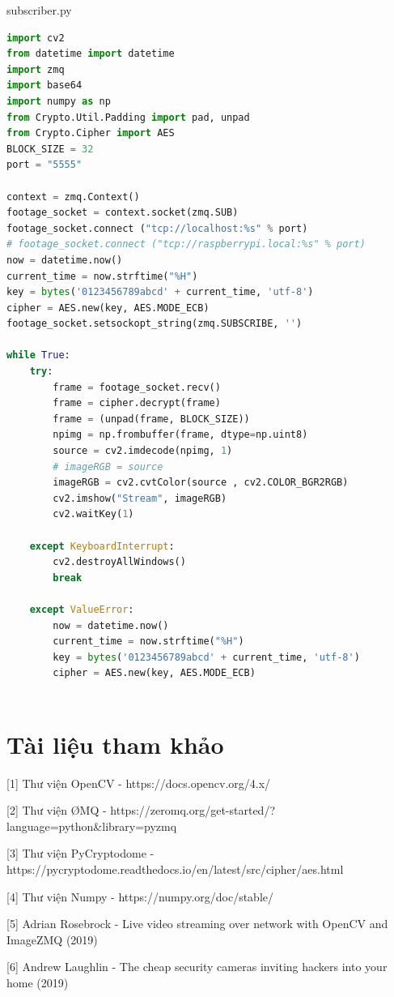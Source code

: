 \documentclass{article}
\begin{document}
subscriber.py
\begin{lstlisting}[language=Python]
import cv2
from datetime import datetime
import zmq
import base64
import numpy as np
from Crypto.Util.Padding import pad, unpad
from Crypto.Cipher import AES
BLOCK_SIZE = 32
port = "5555"

context = zmq.Context()
footage_socket = context.socket(zmq.SUB)
footage_socket.connect ("tcp://localhost:%s" % port)
# footage_socket.connect ("tcp://raspberrypi.local:%s" % port)
now = datetime.now()
current_time = now.strftime("%H")
key = bytes('0123456789abcd' + current_time, 'utf-8')
cipher = AES.new(key, AES.MODE_ECB)
footage_socket.setsockopt_string(zmq.SUBSCRIBE, '')

while True:
    try:
        frame = footage_socket.recv()
        frame = cipher.decrypt(frame)
        frame = (unpad(frame, BLOCK_SIZE))
        npimg = np.frombuffer(frame, dtype=np.uint8)
        source = cv2.imdecode(npimg, 1)
        # imageRGB = source
        imageRGB = cv2.cvtColor(source , cv2.COLOR_BGR2RGB)
        cv2.imshow("Stream", imageRGB)
        cv2.waitKey(1)

    except KeyboardInterrupt:
        cv2.destroyAllWindows()
        break

    except ValueError:
        now = datetime.now()
        current_time = now.strftime("%H")
        key = bytes('0123456789abcd' + current_time, 'utf-8')
        cipher = AES.new(key, AES.MODE_ECB)
    
\end{lstlisting}

\newpage

\section{Tài liệu tham khảo}

[1] Thư viện OpenCV - https://docs.opencv.org/4.x/

[2] Thư viện \O MQ - https://zeromq.org/get-started/?language=python\&library=pyzmq

[3] Thư viện PyCryptodome - https://pycryptodome.readthedocs.io/en/latest/src/cipher/aes.html

[4] Thư viện Numpy - https://numpy.org/doc/stable/

[5] Adrian Rosebrock - Live video streaming over network with OpenCV and ImageZMQ (2019)

[6] Andrew Laughlin - The cheap security cameras inviting hackers into your home (2019)
\end{document}
